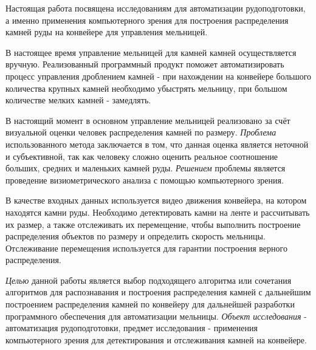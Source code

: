 \documentclass[times]{itmo-student-thesis}
\begin{document}


\tableofcontents


\startprefacepage
Настоящая работа посвящена исследованиям для автоматизации рудоподготовки, а именно применения компьютерного зрения для построения распределения камней руды на конвейере для управления мельницей.

В настоящее время управление мельницей для камней камней осуществляется вручную. Реализованный программный продукт поможет автоматизировать процесс управления дроблением камней - при нахождении на конвейере большого количества крупных камней необходимо убыстрять мельницу, при большом количестве мелких камней - замедлять. 


В настоящий момент в основном управление мельницей реализовано за счёт визуальной  оценки  человек распределения камней по размеру. \textit{Проблема} использованного метода заключается в том, что данная оценка является неточной и субъективной, так как человеку сложно оценить реальное соотношение больших, средних и маленьких камней руды. \textit{Решением} проблемы является проведение визиометрического анализа с помощью компьютерного зрения.

В качестве входных данных используется видео движения конвейера, на котором находятся камни руды. Необходимо детектировать камни на ленте и рассчитывать их размер, а также  отслеживать их перемещение, чтобы выполнить построение распределения объектов по размеру и определить скорость мельницы. Отслеживание перемещения используется для гарантии построения верного распределения. 

	
\textit{Целью} данной работы является выбор подходящего алгоритма или сочетания алгоритмов для распознавания и построения распределения камней с дальнейшим построением распределения камней по конвейеру для дальнейшей разработки программного обеспечения для автоматизации мельницы. \textit{Объект исследования} - автоматизация рудоподготовки, предмет исследования - применения компьютерного зрения для детектирования и отслеживания камней на конвейере. 
\end{document}
